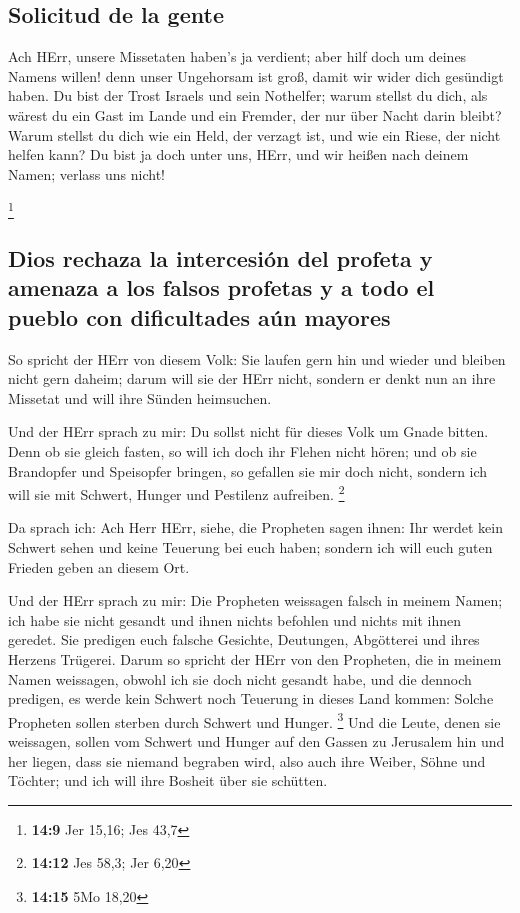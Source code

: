 \hypertarget{solicitud-de-la-gente}{%
\subsection{Solicitud de la gente}\label{solicitud-de-la-gente}}

 Ach HErr, unsere Missetaten haben's ja verdient; aber
hilf doch um deines Namens willen! denn unser Ungehorsam ist groß, damit
wir wider dich gesündigt haben.  Du bist der Trost Israels
und sein Nothelfer; warum stellst du dich, als wärest du ein Gast im
Lande und ein Fremder, der nur über Nacht darin bleibt? 
Warum stellst du dich wie ein Held, der verzagt ist, und wie ein Riese,
der nicht helfen kann? Du bist ja doch unter uns, HErr, und wir heißen
nach deinem Namen; verlass uns nicht!

\footnote{\textbf{14:9} Jer 15,16; Jes 43,7}

\hypertarget{dios-rechaza-la-intercesiuxf3n-del-profeta-y-amenaza-a-los-falsos-profetas-y-a-todo-el-pueblo-con-dificultades-auxfan-mayores}{%
\subsection{Dios rechaza la intercesión del profeta y amenaza a los
falsos profetas y a todo el pueblo con dificultades aún
mayores}\label{dios-rechaza-la-intercesiuxf3n-del-profeta-y-amenaza-a-los-falsos-profetas-y-a-todo-el-pueblo-con-dificultades-auxfan-mayores}}

 So spricht der HErr von diesem Volk: Sie laufen gern hin
und wieder und bleiben nicht gern daheim; darum will sie der HErr nicht,
sondern er denkt nun an ihre Missetat und will ihre Sünden heimsuchen.

 Und der HErr sprach zu mir: Du sollst nicht für dieses
Volk um Gnade bitten.  Denn ob sie gleich fasten, so will
ich doch ihr Flehen nicht hören; und ob sie Brandopfer und Speisopfer
bringen, so gefallen sie mir doch nicht, sondern ich will sie mit
Schwert, Hunger und Pestilenz aufreiben. \footnote{\textbf{14:12} Jes
  58,3; Jer 6,20}

 Da sprach ich: Ach Herr HErr, siehe, die Propheten sagen
ihnen: Ihr werdet kein Schwert sehen und keine Teuerung bei euch haben;
sondern ich will euch guten Frieden geben an diesem Ort.

 Und der HErr sprach zu mir: Die Propheten weissagen
falsch in meinem Namen; ich habe sie nicht gesandt und ihnen nichts
befohlen und nichts mit ihnen geredet. Sie predigen euch falsche
Gesichte, Deutungen, Abgötterei und ihres Herzens Trügerei.
 Darum so spricht der HErr von den Propheten, die in
meinem Namen weissagen, obwohl ich sie doch nicht gesandt habe, und die
dennoch predigen, es werde kein Schwert noch Teuerung in dieses Land
kommen: Solche Propheten sollen sterben durch Schwert und Hunger.
\footnote{\textbf{14:15} 5Mo 18,20}  Und die Leute, denen
sie weissagen, sollen vom Schwert und Hunger auf den Gassen zu Jerusalem
hin und her liegen, dass sie niemand begraben wird, also auch ihre
Weiber, Söhne und Töchter; und ich will ihre Bosheit über sie schütten.

